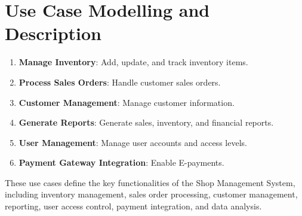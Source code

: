 \section{Use Case Modelling and Description}
\begin{enumerate}
\item \textbf{Manage Inventory}: Add, update, and track inventory items.
\item \textbf{Process Sales Orders}: Handle customer sales orders.
\item \textbf{Customer Management}: Manage customer information.
\item \textbf{Generate Reports}: Generate sales, inventory, and financial reports.
\item \textbf{User Management}: Manage user accounts and access levels.
\item \textbf{Payment Gateway Integration}: Enable E-payments.
\end{enumerate}

These use cases define the key functionalities of the Shop Management System, including inventory management, sales order processing, customer management, reporting, user access control, payment integration, and data analysis.
